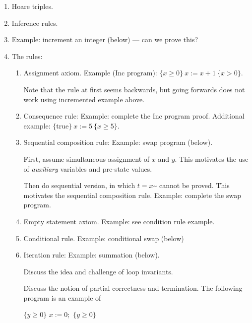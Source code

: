 \documentclass[11pt]{article}
\begin{document}
\begin{enumerate}

 \item Hoare triples.

 \item Inference rules.

 \item Example: increment an integer (below) --- can we prove this?

 \item The rules:

  \begin{enumerate}

   \item Assignment axiom. Example (Inc program): $\{x \geq 0\}~ x := x + 1~ \{x > 0\}$.
 
   Note that the rule at first seems backwards, but going forwards does not work using incremented example above.

   \item Consequence rule: Example: complete the Inc program proof. Additional example: $\{\textrm{true}\} ~x := 5~ \{x \geq 5\}$.

   \item Sequential composition rule: Example: swap program (below). 

    First, assume simultaneous assignment of $x$ and $y$. This motivates the use of \emph{auxiliary} variables and pre-state values.

    Then do sequential version, in which $t=x$\~{} cannot be proved. This motivates the sequential composition rule. Example: complete the swap program.

   \item Empty statement axiom. Example: see condition rule example.

   \item Conditional rule. Example: conditional swap (below)

   \item Iteration rule: Example: summation (below).

     Discuss the idea and challenge of loop invariants.

     Discuss the notion of partial correctness and termination. The following program is an example of 

\begin{algorithmic}[0]
\State $\{y \geq 0\}$
  \State $x := 0;$
\EndWhile
\State $\{y \geq 0\}$
\end{algorithmic}


\end{enumerate}
\end{enumerate}
\end{document}
